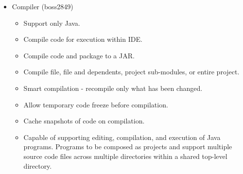 \documentclass[11pt]{report}
\begin{document}
\begin{itemize}
        \item Compiler (boss2849) \begin{itemize}
            \item Support only Java.
            \item Compile code for execution within IDE.
            \item Compile code and package to a JAR.
            \item Compile file, file and dependents, project sub-modules, or entire project.
            \item Smart compilation - recompile only what has been changed. 
            \item Allow temporary code freeze before compilation.
            \item Cache snapshots of code on compilation. 
            \item Capable of supporting editing, compilation, and execution of Java programs. Programs to be composed as projects and support multiple source code files across multiple directories within a shared top-level directory.\end{itemize}
    \end{itemize}
    
\end{document}

